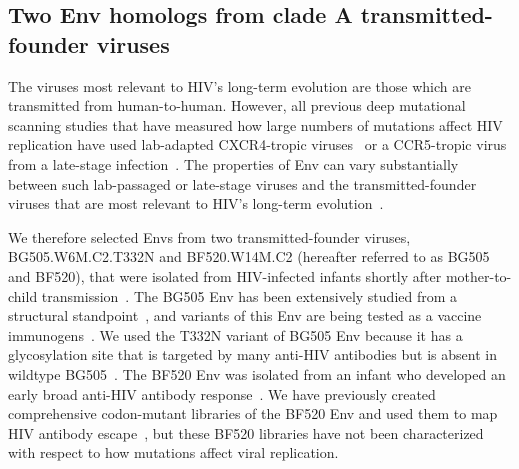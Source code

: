 \documentclass[9pt]{elife}
\begin{document}
\subsection*{Two Env homologs from clade A transmitted-founder viruses}
The viruses most relevant to HIV's long-term evolution are those which are transmitted from human-to-human.
However, all previous deep mutational scanning studies that have measured how large numbers of mutations affect HIV replication have used lab-adapted CXCR4-tropic viruses~\citep[LAI and NL4-3;][]{haddox2016experimental,al2014high} or a CCR5-tropic virus from a late-stage infection~\citep[LN40;][]{duenas2016saturation}.
The properties of Env can vary substantially between such lab-passaged or late-stage viruses and the transmitted-founder viruses that are most relevant to HIV's long-term evolution~\citep{sagar2006human,wilen2011phenotypic,parrish2013phenotypic}.

We therefore selected Envs from two transmitted-founder viruses, BG505.W6M.C2.T332N and BF520.W14M.C2 (hereafter referred to as BG505 and BF520), that were isolated from HIV-infected infants shortly after mother-to-child transmission~\citep{goo2014early}.
The BG505 Env has been extensively studied from a structural standpoint~\citep{julien2013crystal,lyumkis2013cryo,pancera2014structure,huang2014broad,sanders2015hiv,stewart2016trimeric}, and variants of this Env are being tested as a vaccine immunogens~\citep{sanders2013next,sanders2015hiv,de2015immunogenicity}.
We used the T332N variant of BG505 Env because it has a glycosylation site that is targeted by many anti-HIV antibodies but is absent in wildtype BG505~\citep{sanders2013next}.
The BF520 Env was isolated from an infant who developed an early broad anti-HIV antibody response~\citep{goo2014early,simonich2016hiv}.
We have previously created comprehensive codon-mutant libraries of the BF520 Env and used them to map HIV antibody escape~\citep{dingens2017comprehensive}, but these BF520 libraries have not been characterized with respect to how mutations affect viral replication.
\end{document}
